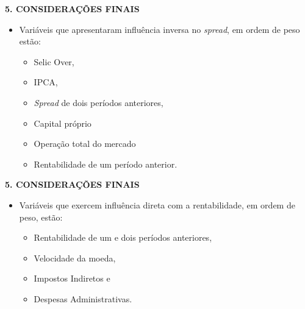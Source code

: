 \documentclass[
  ignorenonframetext,
  aspectratio=169,
  ignorenonframetext]{beamer}
\providecommand{\tightlist}{%
  \setlength{\itemsep}{0pt}\setlength{\parskip}{0pt}}
\begin{document}
\begin{frame}{\textbf{5. CONSIDERAÇÕES FINAIS}}
\protect\hypertarget{considerauxe7uxf5es-finais-3}{}
\begin{itemize}
\tightlist
\item
  Variáveis que apresentaram influência inversa no \emph{spread}, em
  ordem de peso estão:

  \begin{itemize}
  \tightlist
  \item
    Selic Over,
  \item
    IPCA,
  \item
    \emph{Spread} de dois períodos anteriores,
  \item
    Capital próprio
  \item
    Operação total do mercado
  \item
    Rentabilidade de um período anterior.
  \end{itemize}
\end{itemize}
\end{frame}

\begin{frame}{\textbf{5. CONSIDERAÇÕES FINAIS}}
\protect\hypertarget{considerauxe7uxf5es-finais-4}{}
\begin{itemize}
\tightlist
\item
  Variáveis que exercem influência direta com a rentabilidade, em ordem
  de peso, estão:

  \begin{itemize}
  \tightlist
  \item
    Rentabilidade de um e dois períodos anteriores,
  \item
    Velocidade da moeda,
  \item
    Impostos Indiretos e
  \item
    Despesas Administrativas.
  \end{itemize}
\end{itemize}
\end{frame}
\end{document}
